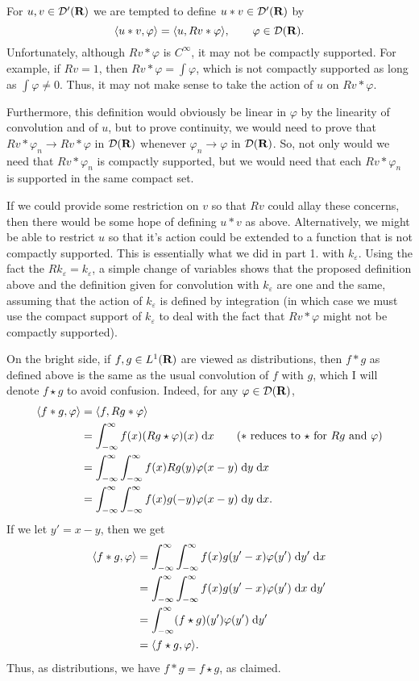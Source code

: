 \documentclass{homework}
\begin{document}
	\question For $u, v \in \mathcal{D}'(\textnormal{\bf R})$ we are tempted to define $u * v \in \mathcal{D}'(\textnormal{\bf R})$ by
	\begin{equation}
		\langle u * v, \varphi \rangle = \langle u, Rv * \varphi\rangle, \qquad \varphi \in \mathcal{D}(\textnormal{\bf R}).
	\end{equation}
	Unfortunately, although $Rv * \varphi$ is $C^\infty$, it may not be compactly supported. For example, if $Rv = 1$, then $Rv * \varphi = \int\varphi$, which is not compactly supported as long as $\int \varphi \ne 0$. Thus, it may not make sense to take the action of $u$ on $Rv * \varphi$.
	
	Furthermore, this definition would obviously be linear in $\varphi$ by the linearity of convolution and of $u$, but to prove continuity, we would need to prove that $Rv * \varphi_n \to Rv*\varphi$ in $\mathcal{D}(\textnormal{\bf R})$ whenever $\varphi_n \to \varphi$ in $\mathcal{D}(\textnormal{\bf R})$. So, not only would we need that $Rv*\varphi_n$ is compactly supported, but we would need that each $Rv*\varphi_n$ is supported in the same compact set.
	
	If we could provide some restriction on $v$ so that $Rv$ could allay these concerns, then there would be some hope of defining $u * v$ as above. Alternatively, we might be able to restrict $u$ so that it's action could be extended to a function that is not compactly supported. This is essentially what we did in part 1. with $k_\varepsilon$. Using the fact the $Rk_\varepsilon = k_\varepsilon$, a simple change of variables shows that the proposed definition above and the definition given for convolution with $k_\varepsilon$ are one and the same, assuming that the action of $k_\varepsilon$ is defined by integration (in which case we must use the compact support of $k_\varepsilon$ to deal with the fact that $Rv*\varphi$ might not be compactly supported).
		
	On the bright side, if $f, g\in L^1(\textnormal{\bf R})$ are viewed as distributions, then $f*g$ as defined above is the same as the usual convolution of $f$ with $g$, which I will denote $f \star g$ to avoid confusion. Indeed, for any $\varphi \in \mathcal{D}(\textnormal{\bf R})$,
	\begin{align}
		\langle f * g, \varphi\rangle &= \langle f, Rg * \varphi\rangle \\
		&= \int_{-\infty}^\infty f(x) (Rg \star \varphi)(x) \;\text{d} x \qquad \text{($*$ reduces to $\star$ for $Rg$ and $\varphi$)}\\
		&= \int_{-\infty}^\infty\int_{-\infty}^\infty f(x) Rg(y)\varphi(x-y)\;\text{d} y \;\text{d} x \\
		&= \int_{-\infty}^\infty\int_{-\infty}^\infty f(x)g(-y)\varphi(x-y)\;\text{d} y\;\text{d} x.
	\end{align}
	If we let $y' = x- y$, then we get
	\begin{align}
		\langle f * g, \varphi\rangle &= \int_{-\infty}^\infty \int_{-\infty}^\infty f(x)g(y'-x)\varphi(y')\;\text{d} y' \;\text{d} x \\
		&= \int_{-\infty}^\infty \int_{-\infty}^\infty f(x)g(y'-x)\varphi(y')\;\text{d} x \;\text{d} y' \\
		&= \int_{-\infty}^\infty (f \star g)(y')\varphi(y') \;\text{d} y' \\
		&= \langle f\star g, \varphi\rangle.
	\end{align}
	Thus, as distributions, we have $f * g = f\star g$, as claimed.
\end{document}
